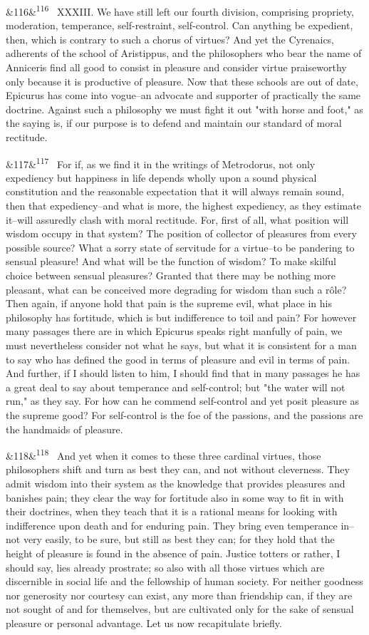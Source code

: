 \documentclass[12pt]{article}
\newcommand{\para}[1][]{\par\noindent\ifx&#1&\else\textsuperscript{\footnotesize #1}~\fi}
\begin{document}
\para[116] XXXIII. We have still left our fourth division, comprising propriety, moderation, temperance, self-restraint, self-control. Can anything be expedient, then, which is contrary to such a chorus of virtues? And yet the Cyrenaics, adherents of the school of Aristippus, and the philosophers who bear the name of Anniceris find all good to consist in pleasure and consider virtue praiseworthy only because it is productive of pleasure. Now that these schools are out of date, Epicurus has come into vogue--an advocate and supporter of practically the same doctrine. Against such a philosophy we must fight it out "with horse and foot," as the saying is, if our purpose is to defend and maintain our standard of moral rectitude.

\para[117] For if, as we find it in the writings of Metrodorus, not only expediency but happiness in life depends wholly upon a sound physical constitution and the reasonable expectation that it will always remain sound, then that expediency--and what is more, the highest expediency, as they estimate it--will assuredly clash with moral rectitude. For, first of all, what position will wisdom occupy in that system? The position of collector of pleasures from every possible source? What a sorry state of servitude for a virtue--to be pandering to sensual pleasure! And what will be the function of wisdom? To make skilful choice between sensual pleasures? Granted that there may be nothing more pleasant, what can be conceived more degrading for wisdom than such a rôle? Then again, if anyone hold that pain is the supreme evil, what place in his philosophy has fortitude, which is but indifference to toil and pain? For however many passages there are in which Epicurus speaks right manfully of pain, we must nevertheless consider not what he says, but what it is consistent for a man to say who has defined the good in terms of pleasure and evil in terms of pain. And further, if I should listen to him, I should find that in many passages he has a great deal to say about temperance and self-control; but "the water will not run," as they say. For how can he commend self-control and yet posit pleasure as the supreme good? For self-control is the foe of the passions, and the passions are the handmaids of pleasure.

\para[118] And yet when it comes to these three cardinal virtues, those philosophers shift and turn as best they can, and not without cleverness. They admit wisdom into their system as the knowledge that provides pleasures and banishes pain; they clear the way for fortitude also in some way to fit in with their doctrines, when they teach that it is a rational means for looking with indifference upon death and for enduring pain. They bring even temperance in--not very easily, to be sure, but still as best they can; for they hold that the height of pleasure is found in the absence of pain. Justice totters or rather, I should say, lies already prostrate; so also with all those virtues which are discernible in social life and the fellowship of human society. For neither goodness nor generosity nor courtesy can exist, any more than friendship can, if they are not sought of and for themselves, but are cultivated only for the sake of sensual pleasure or personal advantage. Let us now recapitulate briefly.
\end{document}
